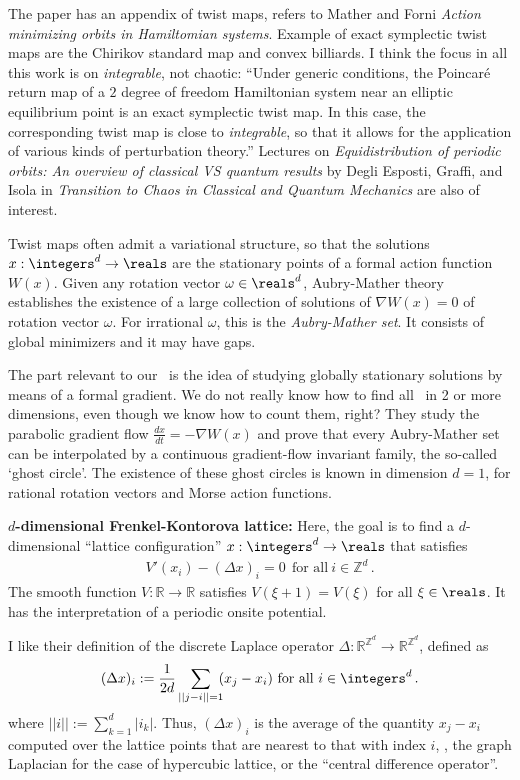 \begin{description}
The paper has an appendix of twist maps, refers to Mather and
Forni {\em Action minimizing orbits in {Hamiltomian}
systems}. Example of exact symplectic twist maps are the Chirikov
standard map and convex billiards. I think the focus in all this work is
on {\em integrable}, not chaotic:
``Under generic conditions, the Poincar\'e return map of a $2$ degree of
freedom Hamiltonian system near an elliptic equilibrium point is an exact
symplectic twist map. In this case, the corresponding twist map is close
to {\it integrable}, so that it allows for the application of various
kinds of perturbation theory.''
Lectures on {\em Equidistribution of periodic orbits: An overview of
classical VS quantum results} by Degli Esposti, Graffi, and Isola in {\em
Transition to Chaos in Classical and Quantum Mechanics} are
also of interest.

Twist maps often admit a variational structure, so that the solutions
$x:\integers^d\to \reals$ are the stationary points of a formal action
function $W(x)$. Given any rotation vector $\omega\in \reals^d$,
Aubry-Mather theory establishes the existence of a large collection of
solutions of $\nabla W(x)=0$ of rotation vector $\omega$. For irrational
$\omega$, this is the {\em Aubry-Mather set}. It consists of global
minimizers and it may have gaps.

The part relevant to our \catlatt\ is the idea of studying globally
stationary solutions by means of a formal gradient. We do not really know
how to find all \twots\ in 2 or more dimensions, even though we know how
to count them, right?
They study the parabolic gradient flow
$\frac{dx}{dt} = -\nabla W(x)$
and prove that every Aubry-Mather set can be
interpolated by a continuous gradient-flow invariant family, the
so-called `ghost circle'. The existence of these ghost circles is known
in dimension $d=1$, for rational rotation vectors and Morse action
functions.

\medskip
{\bf $d$-dimensional Frenkel-Kontorova lattice:}
Here, the goal is to find a
$d$-dimensional ``lattice configuration'' $x:\integers^d\to \reals$ that satisfies
\begin{align}\label{MraRin12:RR}
V'(x_i) - (\Delta x)_i = 0 \  \ \mbox{for all} \ i\in \mathbb{Z}^d
\,.
\end{align}
The smooth function $V: \mathbb{R} \to \mathbb{R}$
satisfies $V(\xi+1)=V(\xi)$ for all $\xi\in\reals$. It has the interpretation
of a periodic onsite potential.

I like their definition of the discrete Laplace operator
$\Delta:\mathbb{R}^{\mathbb{Z}^d}\to\mathbb{R}^{\mathbb{Z}^d}$, defined as
\begin{align}\label{Lap}
(\Delta x)_i := \frac{1}{2d} \sum_{||j-i||=1} \!\! (x_j - x_i)
\ \mbox{for all} \ i \in \integers^d
\,.
\end{align}
where $||i||:=\sum_{k=1}^{d}|i_k|$.
Thus, $(\Delta x)_i$ is the average of the quantity $x_j-x_i$ computed
over the lattice points that are nearest to that with index $i$, \ie, the
graph Laplacian  for the case
of hypercubic lattice, or the ``central difference operator''.


\end{description}
